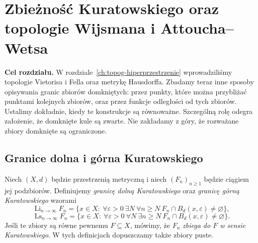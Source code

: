 \chapter{Zbieżność Kuratowskiego oraz topologie Wijsmana i Attoucha--Wetsa}
\label{ch:topog22-zbieznosc-zbiorow}

\noindent\textbf{Cel rozdziału.}
W rozdziale~\ref{ch:topog-hiperprzestrzenie} wprowadziliśmy topologie
Vietorisa i Fella oraz metrykę Hausdorffa. Zbadamy teraz inne
sposoby opisywania granic zbiorów domkniętych: przez punkty,
które można przybliżać punktami kolejnych zbiorów, oraz przez funkcje
odległości od tych zbiorów.
Ustalimy dokładnie, kiedy te konstrukcje są równoważne.
Szczególną rolę odegra założenie, że domknięte kule są zwarte.
Nie zakładamy z góry, że rozważane zbiory domknięte są ograniczone.

\section{Granice dolna i górna Kuratowskiego}
\label{sec:topog22-kuratowski}

\begin{definicja}
\label{def:topog22-kuratowski}
Niech \((X,d)\) będzie przestrzenią metryczną
i niech \((F_n)_{n\ge1}\) będzie ciągiem jej podzbiorów.
Definiujemy \emph{granicę dolną Kuratowskiego}
oraz \emph{granicę górną Kuratowskiego} wzorami
\[
 \operatorname{Li}_{n\to\infty}F_n
 =\bigl\{x\in X:\ \forall\varepsilon>0\
     \exists N\ \forall n\ge N\
     F_n\cap B_d(x,\varepsilon)\neq\varnothing\bigr\},
\]
\[
 \operatorname{Ls}_{n\to\infty}F_n
 =\bigl\{x\in X:\ \forall\varepsilon>0\
     \forall N\ \exists n\ge N\
     F_n\cap B_d(x,\varepsilon)\neq\varnothing\bigr\}.
\]
Jeśli te zbiory są równe pewnemu \(F\subseteq X\),
mówimy, że \(F_n\) \emph{zbiega do \(F\) w sensie
Kuratowskiego}.
W tych definicjach dopuszczamy także zbiory puste.
\end{definicja}

